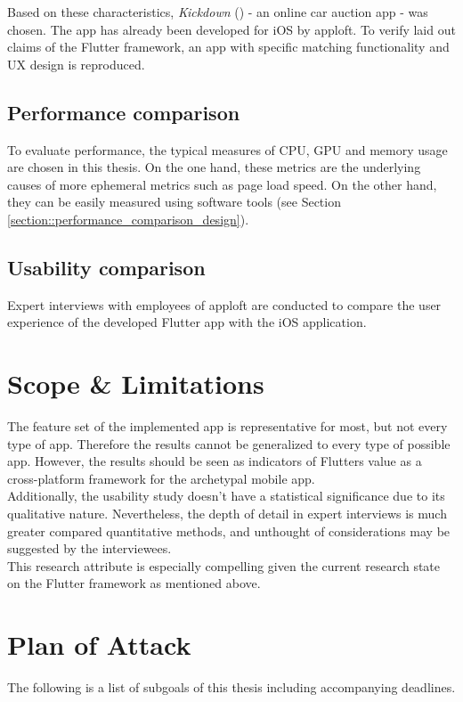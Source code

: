 Based on these characteristics, \textit{Kickdown} (\cite{Kickdown2021}) - an online car auction app - was chosen. 
The app has already been developed for iOS by apploft.
To verify laid out claims of the Flutter framework, an app with specific matching functionality and UX design is reproduced.

\subsection{Performance comparison}
To evaluate performance, the typical measures of CPU, GPU and memory usage are chosen in this thesis. 
On the one hand, these metrics are the underlying causes of more ephemeral metrics such as page load speed. 
On the other hand, they can be easily measured using software tools (see Section \ref{section::performance_comparison_design}).

\subsection{Usability comparison}
Expert interviews with employees of apploft are conducted to compare the user experience of the developed Flutter app with the iOS application.

\section{Scope \& Limitations}
The feature set of the implemented app is representative for most, but not every type of app. Therefore the results cannot be generalized to 
every type of possible app. However, the results should be seen as indicators of Flutters value as a cross-platform framework for the 
archetypal mobile app.\\
Additionally, the usability study doesn't have a statistical significance due to its qualitative nature. Nevertheless, the depth of detail
in expert interviews is much greater compared quantitative methods, and unthought of considerations may be suggested by the interviewees.\\
This research attribute is especially compelling given the current research state on the Flutter framework as mentioned above. 

\section{Plan of Attack}
\label{section:planofattack}
The following is a list of subgoals of this thesis including accompanying deadlines.


